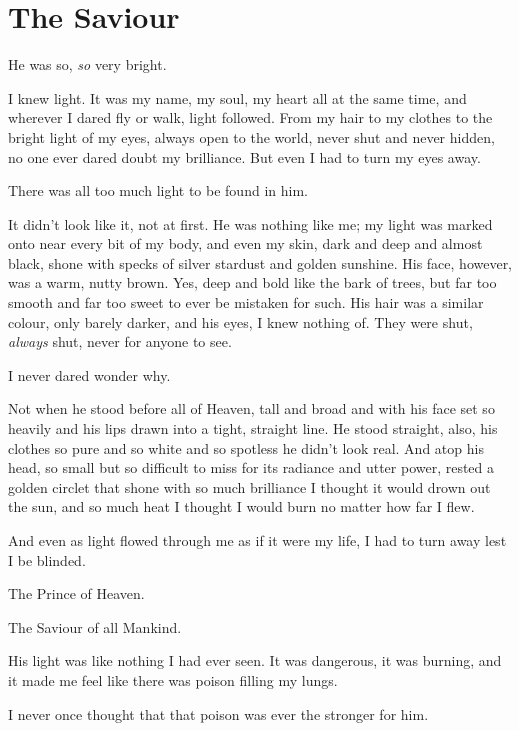 \documentclass[fontsize=11pt,paper=a5,pagesize=auto]{scrbook}
\begin{document}
\section{The Saviour}
He was so, \textit{so} very bright.\par
I knew light. It was my name, my soul, my heart all at the same time, and wherever I dared fly or walk, light followed. From my hair to my clothes to the bright light of my eyes, always open to the world, never shut and never hidden, no one ever dared doubt my brilliance. But even I had to turn my eyes away.\par
There was all too much light to be found in him. \par
It didn't look like it, not at first. He was nothing like me; my light was marked onto near every bit of my body, and even my skin, dark and deep and almost black, shone with specks of silver stardust and golden sunshine. His face, however, was a warm, nutty brown. Yes, deep and bold like the bark of trees, but far too smooth and far too sweet to ever be mistaken for such. His hair was a similar colour, only barely darker, and his eyes, I knew nothing of. They were shut, \textit{always} shut, never for anyone to see. \par
I never dared wonder why.\par
Not when he stood before all of Heaven, tall and broad and with his face set so heavily and his lips drawn into a tight, straight line. He stood straight, also, his clothes so pure and so white and so spotless he didn't look real. And atop his head, so small but so difficult to miss for its radiance and utter power, rested a golden circlet that shone with so much brilliance I thought it would drown out the sun, and so much heat I thought I would burn no matter how far I flew.\par
And even as light flowed through me as if it were my life, I had to turn away lest I be blinded.\par 
The Prince of Heaven.\par 
The Saviour of all Mankind. \par
His light was like nothing I had ever seen. It was dangerous, it was burning, and it made me feel like there was poison filling my lungs.\par
I never once thought that that poison was ever the stronger for him.
\end{document}
